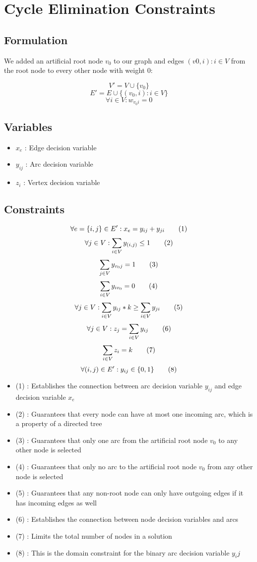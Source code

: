 \section{Cycle Elimination Constraints}

\subsection{Formulation}

We added an artificial root node $v_0$ to our graph and edges $(v0,i) : i \in V$  from the root node to every other node with weight $0$:

\[V' = V \cup \{v_0\}\]
\[E' = E \cup \{(v_0,i) : i \in V\}\]
\[\forall i \in V : w_{v_0i} = 0 \]

\subsection{Variables}

\begin{itemize}
	\item $x_{e}$ : Edge decision variable
	\item $y_{ij}$ : Arc decision variable
	\item $z_{i}$ : Vertex decision variable
\end{itemize}

\subsection{Constraints}
\[\forall e = \{i,j\} \in E' : x_e = y_{ij} + y_{ji} \addtag \]
\[\forall j \in V : \sum_{i \in V}y_{(i,j)} \leq 1 \addtag \]
\[\sum_{j \in V}y_{v_0j} = 1 \addtag \]
\[\sum_{i \in V}y_{iv_0} = 0 \addtag \]
\[\forall j \in V : \sum_{i \in V}y_{ij} * k \geq \sum_{i \in V}y_{ji} \addtag \]
\[\forall j \in V : z_j = \sum_{i \in V}y_{ij} \addtag \]
\[\sum_{i \in V}z_i = k \addtag \]
\[\forall (i,j) \in E' : y_{ij} \in \{0,1\} \addtag \]

\begin{itemize}
	\item (1) : Establishes the connection between arc decision variable $y_{ij}$ and edge decision variable $x_e$
	\item (2) : Guarantees that every node can have at most one incoming arc, which is a property of a directed tree
	\item (3) : Guarantees that only one arc from the artificial root node $v_0$ to any other node is selected
   	\item (4) : Guarantees that only no arc to the artificial root node $v_0$ from any other node is selected
   	\item (5) : Guarantees that any non-root node can only have outgoing edges if it has incoming edges as well
   	\item (6) : Establishes the connection between node decision variables and arcs
   	\item (7) : Limits the total number of nodes in a solution
	\item (8) : This is the domain constraint for the binary arc decision variable $y_ij$
\end{itemize}

